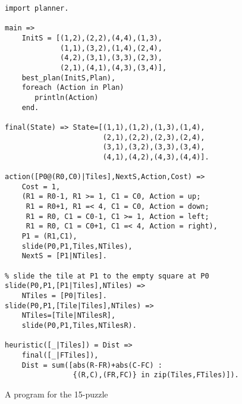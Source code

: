 \begin{figure}[t]
\begin{center}
\begin{verbatim}
import planner.

main =>
    InitS = [(1,2),(2,2),(4,4),(1,3),
             (1,1),(3,2),(1,4),(2,4),
             (4,2),(3,1),(3,3),(2,3),
             (2,1),(4,1),(4,3),(3,4)],
    best_plan(InitS,Plan),
    foreach (Action in Plan)
       println(Action)
    end.

final(State) => State=[(1,1),(1,2),(1,3),(1,4),
                       (2,1),(2,2),(2,3),(2,4),
                       (3,1),(3,2),(3,3),(3,4),
                       (4,1),(4,2),(4,3),(4,4)].

action([P0@(R0,C0)|Tiles],NextS,Action,Cost) =>
    Cost = 1,
    (R1 = R0-1, R1 >= 1, C1 = C0, Action = up;
     R1 = R0+1, R1 =< 4, C1 = C0, Action = down;
     R1 = R0, C1 = C0-1, C1 >= 1, Action = left;
     R1 = R0, C1 = C0+1, C1 =< 4, Action = right),
    P1 = (R1,C1),
    slide(P0,P1,Tiles,NTiles),
    NextS = [P1|NTiles].

% slide the tile at P1 to the empty square at P0
slide(P0,P1,[P1|Tiles],NTiles) =>
    NTiles = [P0|Tiles].
slide(P0,P1,[Tile|Tiles],NTiles) =>
    NTiles=[Tile|NTilesR],
    slide(P0,P1,Tiles,NTilesR).

heuristic([_|Tiles]) = Dist =>
    final([_|FTiles]),
    Dist = sum([abs(R-FR)+abs(C-FC) : 
                {(R,C),(FR,FC)} in zip(Tiles,FTiles)]).
\end{verbatim}
\end{center}
\caption{\label{fig:15puzzlesol}A program for the 15-puzzle}
\end{figure}



